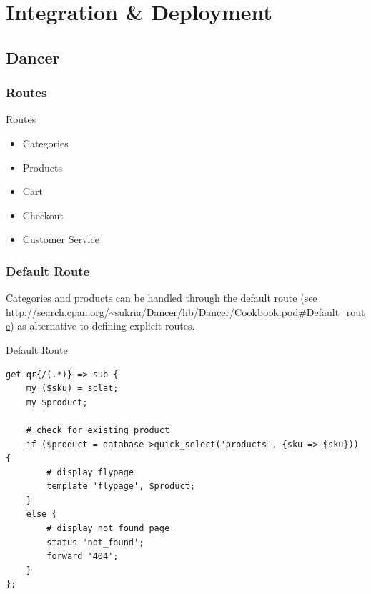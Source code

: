 \section{Integration \& Deployment}
\subsection{Dancer}
\subsubsection{Routes}
\begin{frame}{Routes}
\begin{itemize}
\item Categories
\item Products
\item Cart
\item Checkout
\item Customer Service
\end{itemize}
\end{frame}

\subsubsection{Default Route}
Categories and products can be handled through the default route
(see
\url{http://search.cpan.org/~sukria/Dancer/lib/Dancer/Cookbook.pod#Default_route})
as alternative to defining explicit routes.

\begin{frame}[fragile]{Default Route}
\begin{lstlisting}
get qr{/(.*)} => sub {
    my ($sku) = splat;
    my $product;

    # check for existing product
    if ($product = database->quick_select('products', {sku => $sku})) {
        # display flypage
        template 'flypage', $product;
    }
    else {
        # display not found page
        status 'not_found';
        forward '404';
    }
};
\end{lstlisting}
\end{frame}


